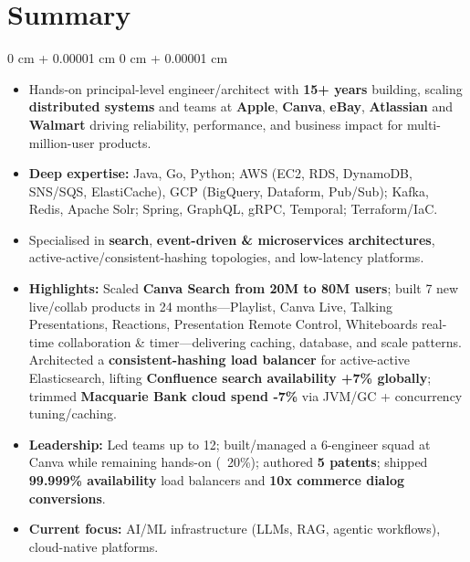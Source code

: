 \documentclass[10pt, letterpaper]{article}
\newenvironment{highlights}{
    \begin{itemize}[
        topsep=0.10 cm,
        parsep=0.10 cm,
        partopsep=0pt,
        itemsep=0pt,
        leftmargin=0 cm + 10pt
    ]
}{
    \end{itemize}
} %
\newenvironment{onecolentry}{
    \begin{adjustwidth}{
        0 cm + 0.00001 cm
    }{
        0 cm + 0.00001 cm
    }
}{
    \end{adjustwidth}
} %
\begin{document}
    \vspace{5 pt - 0.3 cm}

    \section{Summary}
    \begin{onecolentry}
        \begin{highlights}
            \item Hands-on principal-level engineer/architect with \textbf{15+ years} building, scaling \textbf{distributed systems} and teams at \textbf{Apple}, \textbf{Canva}, \textbf{eBay}, \textbf{Atlassian} and \textbf{Walmart} driving reliability, performance, and business impact for multi-million-user products.
            
            \item \textbf{Deep expertise:} Java, Go, Python; AWS (EC2, RDS, DynamoDB, SNS/SQS, ElastiCache), GCP (BigQuery, Dataform, Pub/Sub); Kafka, Redis, Apache Solr; Spring, GraphQL, gRPC, Temporal; Terraform/IaC.
            
            \item Specialised in \textbf{search}, \textbf{event-driven \& microservices architectures}, active-active/consistent-hashing topologies, and low-latency platforms.
            
            \item \textbf{Highlights:} Scaled \textbf{Canva Search from 20M to 80M users}; built 7 new live/collab products in 24 months---Playlist, Canva Live, Talking Presentations, Reactions, Presentation Remote Control, Whiteboards real-time collaboration \& timer---delivering caching, database, and scale patterns. Architected a \textbf{consistent-hashing load balancer} for active-active Elasticsearch, lifting \textbf{Confluence search availability +7\% globally}; trimmed \textbf{Macquarie Bank cloud spend -7\%} via JVM/GC + concurrency tuning/caching.
            
            \item \textbf{Leadership:} Led teams up to 12; built/managed a 6-engineer squad at Canva while remaining hands-on (~20\%); authored \textbf{5 patents}; shipped \textbf{99.999\% availability} load balancers and \textbf{10x commerce dialog conversions}.
            
            \item \textbf{Current focus:} AI/ML infrastructure (LLMs, RAG, agentic workflows), cloud-native platforms.
        \end{highlights}
    \end{onecolentry} 
\end{document}
